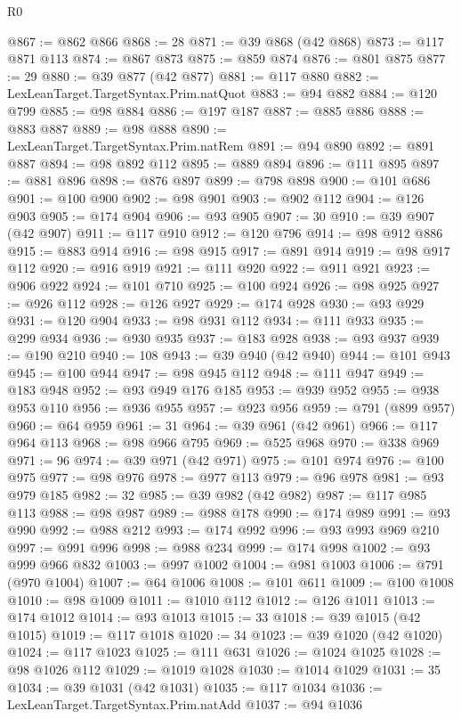\begin{lexlean}{R0}
\begin{coremodule}
@867 := @862 @866
@868 := 28
@871 := @39 @868 (@42 @868)
@873 := @117 @871 @113
@874 := @867 @873
@875 := @859 @874
@876 := @801 @875
@877 := 29
@880 := @39 @877 (@42 @877)
@881 := @117 @880
@882 := LexLeanTarget.TargetSyntax.Prim.natQuot
@883 := @94 @882
@884 := @120 @799
@885 := @98 @884
@886 := @197 @187
@887 := @885 @886
@888 := @883 @887
@889 := @98 @888
@890 := LexLeanTarget.TargetSyntax.Prim.natRem
@891 := @94 @890
@892 := @891 @887
@894 := @98 @892 @112
@895 := @889 @894
@896 := @111 @895
@897 := @881 @896
@898 := @876 @897
@899 := @798 @898
@900 := @101 @686
@901 := @100 @900
@902 := @98 @901
@903 := @902 @112
@904 := @126 @903
@905 := @174 @904
@906 := @93 @905
@907 := 30
@910 := @39 @907 (@42 @907)
@911 := @117 @910
@912 := @120 @796
@914 := @98 @912 @886
@915 := @883 @914
@916 := @98 @915
@917 := @891 @914
@919 := @98 @917 @112
@920 := @916 @919
@921 := @111 @920
@922 := @911 @921
@923 := @906 @922
@924 := @101 @710
@925 := @100 @924
@926 := @98 @925
@927 := @926 @112
@928 := @126 @927
@929 := @174 @928
@930 := @93 @929
@931 := @120 @904
@933 := @98 @931 @112
@934 := @111 @933
@935 := @299 @934
@936 := @930 @935
@937 := @183 @928
@938 := @93 @937
@939 := @190 @210
@940 := 108
@943 := @39 @940 (@42 @940)
@944 := @101 @943
@945 := @100 @944
@947 := @98 @945 @112
@948 := @111 @947
@949 := @183 @948
@952 := @93 @949 @176 @185
@953 := @939 @952
@955 := @938 @953 @110
@956 := @936 @955
@957 := @923 @956
@959 := @791 (@899 @957)
@960 := @64 @959
@961 := 31
@964 := @39 @961 (@42 @961)
@966 := @117 @964 @113
@968 := @98 @966 @795
@969 := @525 @968
@970 := @338 @969
@971 := 96
@974 := @39 @971 (@42 @971)
@975 := @101 @974
@976 := @100 @975
@977 := @98 @976
@978 := @977 @113
@979 := @96 @978
@981 := @93 @979 @185
@982 := 32
@985 := @39 @982 (@42 @982)
@987 := @117 @985 @113
@988 := @98 @987
@989 := @988 @178
@990 := @174 @989
@991 := @93 @990
@992 := @988 @212
@993 := @174 @992
@996 := @93 @993 @969 @210
@997 := @991 @996
@998 := @988 @234
@999 := @174 @998
@1002 := @93 @999 @966 @832
@1003 := @997 @1002
@1004 := @981 @1003
@1006 := @791 (@970 @1004)
@1007 := @64 @1006
@1008 := @101 @611
@1009 := @100 @1008
@1010 := @98 @1009
@1011 := @1010 @112
@1012 := @126 @1011
@1013 := @174 @1012
@1014 := @93 @1013
@1015 := 33
@1018 := @39 @1015 (@42 @1015)
@1019 := @117 @1018
@1020 := 34
@1023 := @39 @1020 (@42 @1020)
@1024 := @117 @1023
@1025 := @111 @631
@1026 := @1024 @1025
@1028 := @98 @1026 @112
@1029 := @1019 @1028
@1030 := @1014 @1029
@1031 := 35
@1034 := @39 @1031 (@42 @1031)
@1035 := @117 @1034
@1036 := LexLeanTarget.TargetSyntax.Prim.natAdd
@1037 := @94 @1036

\end{coremodule}
\end{lexlean}
